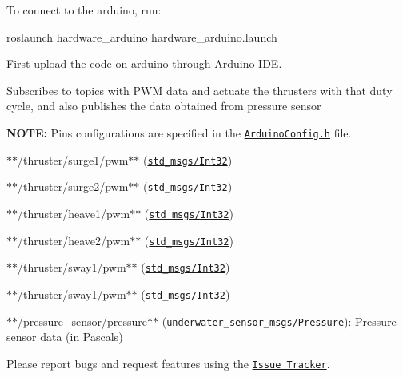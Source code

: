 To connect to the arduino, run\+: 
\begin{DoxyCode}
roslaunch hardware\_arduino hardware\_arduino.launch
\end{DoxyCode}
 First upload the code on arduino through Arduino I\+DE.

Subscribes to topics with P\+WM data and actuate the thrusters with that duty cycle, and also publishes the data obtained from pressure sensor

{\bfseries N\+O\+TE\+:} Pins configurations are specified in the \href{include/ArduinoConfig.h}{\tt Arduino\+Config.\+h} file.


\begin{DoxyItemize}
\item $\ast$$\ast${\ttfamily /thruster/surge1/pwm}$\ast$$\ast$ (\href{http://docs.ros.org/api/std_msgs/html/msg/Int32.html}{\tt std\+\_\+msgs/\+Int32})
\item $\ast$$\ast${\ttfamily /thruster/surge2/pwm}$\ast$$\ast$ (\href{http://docs.ros.org/api/std_msgs/html/msg/Int32.html}{\tt std\+\_\+msgs/\+Int32})
\item $\ast$$\ast${\ttfamily /thruster/heave1/pwm}$\ast$$\ast$ (\href{http://docs.ros.org/api/std_msgs/html/msg/Int32.html}{\tt std\+\_\+msgs/\+Int32})
\item $\ast$$\ast${\ttfamily /thruster/heave2/pwm}$\ast$$\ast$ (\href{http://docs.ros.org/api/std_msgs/html/msg/Int32.html}{\tt std\+\_\+msgs/\+Int32})
\item $\ast$$\ast${\ttfamily /thruster/sway1/pwm}$\ast$$\ast$ (\href{http://docs.ros.org/api/std_msgs/html/msg/Int32.html}{\tt std\+\_\+msgs/\+Int32})
\item $\ast$$\ast${\ttfamily /thruster/sway1/pwm}$\ast$$\ast$ (\href{http://docs.ros.org/api/std_msgs/html/msg/Int32.html}{\tt std\+\_\+msgs/\+Int32})
\end{DoxyItemize}


\begin{DoxyItemize}
\item $\ast$$\ast${\ttfamily /pressure\+\_\+sensor/pressure}$\ast$$\ast$ (\href{http://docs.ros.org/hydro/api/underwater_sensor_msgs/html/msg/Pressure.html}{\tt underwater\+\_\+sensor\+\_\+msgs/\+Pressure})\+: Pressure sensor data (in Pascals)
\end{DoxyItemize}

Please report bugs and request features using the \href{https://github.com/AUV-IITK/auv2017/issues}{\tt Issue Tracker}. 